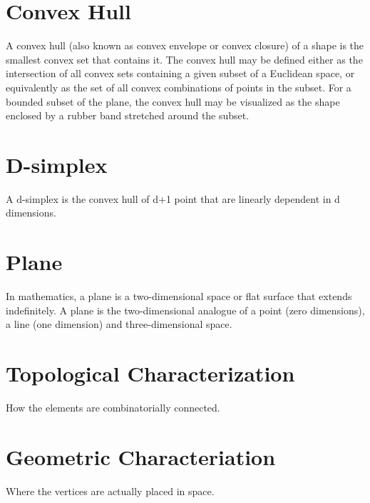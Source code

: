 \section{Convex Hull}
A convex hull (also known as convex envelope or convex closure) of a shape is the smallest convex set that contains it. The convex hull may be defined either as the intersection of all convex sets containing a given subset of a Euclidean space, or equivalently as the set of all convex combinations of points in the subset. For a bounded subset of the plane, the convex hull may be visualized as the shape enclosed by a rubber band stretched around the subset.

\section{D-simplex}
A d-simplex is the convex hull of d+1 point that are linearly dependent in d dimensions.

\section{Plane}
In mathematics, a plane is a two-dimensional space or flat surface that extends indefinitely. A plane is the two-dimensional analogue of a point (zero dimensions), a line (one dimension) and three-dimensional space. 

\section{Topological Characterization}
How the elements are combinatorially connected.

\section{Geometric Characteriation}
Where the vertices are actually placed in space.

